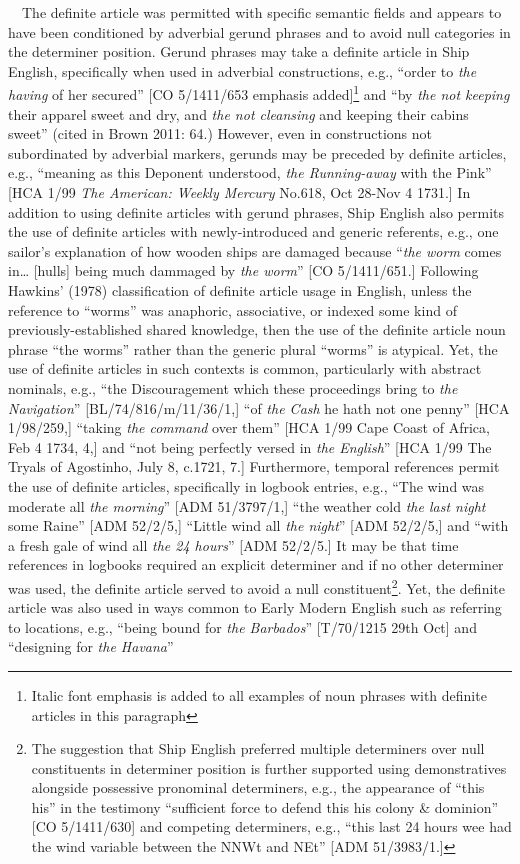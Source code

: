\begin{styleStandard}
\ \ The definite article was permitted with specific semantic fields and appears to have been conditioned by adverbial gerund phrases and to avoid null categories in the determiner position. Gerund phrases may take a definite article in Ship English, specifically when used in adverbial constructions, e.g., “order to \textit{the having} of her secured” [CO 5/1411/653 emphasis added]\footnote{ Italic font emphasis is added to all examples of noun phrases with definite articles in this paragraph} and “by \textit{the not keeping} their apparel sweet and dry, and \textit{the not cleansing} and keeping their cabins sweet” (cited in Brown 2011: 64.) However, even in constructions not subordinated by adverbial markers, gerunds may be preceded by definite articles, e.g., “meaning as this Deponent understood, \textit{the Running-away} with the Pink” [HCA 1/99 \textit{The American: Weekly Mercury }No.618, Oct 28-Nov 4 1731.] In addition to using definite articles with gerund phrases, Ship English also permits the use of definite articles with newly-introduced and generic referents, e.g., one sailor’s explanation of how wooden ships are damaged because “\textit{the worm} comes in… [hulls] being much dammaged by \textit{the worm}” [CO 5/1411/651.] Following Hawkins’ (1978) classification of definite article usage in English, unless the reference to “worms” was anaphoric, associative, or indexed some kind of previously-established shared knowledge, then the use of the definite article noun phrase “the worms” rather than the generic plural “worms” is atypical. Yet, the use of definite articles in such contexts is common, particularly with abstract nominals, e.g., “the Discouragement which these proceedings bring to \textit{the Navigation}” [BL/74/816/m/11/36/1,] “of \textit{the Cash }he hath not one penny” [HCA 1/98/259,] “taking \textit{the command} over them” [HCA 1/99 Cape Coast of Africa, Feb 4 1734, 4,] and “not being perfectly versed in \textit{the English}” [HCA 1/99 The Tryals of Agostinho, July 8, c.1721, 7.] Furthermore, temporal references permit the use of definite articles, specifically in logbook entries, e.g., “The wind was moderate all \textit{the morning}” [ADM 51/3797/1,] “the weather cold \textit{the last night} some Raine” [ADM 52/2/5,] “Little wind all \textit{the night}” [ADM 52/2/5,] and “with a fresh gale of wind all \textit{the 24 hours}” [ADM 52/2/5.] It may be that time references in logbooks required an explicit determiner and if no other determiner was used, the definite article served to avoid a null constituent\footnote{ The suggestion that Ship English preferred multiple determiners over null constituents in determiner position is further supported using demonstratives alongside possessive pronominal determiners, e.g., the appearance of “this his” in the testimony “sufficient force to defend this his colony \& dominion” [CO 5/1411/630] and competing determiners, e.g., “this last 24 hours wee had the wind variable between the NNWt and NEt” [ADM 51/3983/1.]}. Yet, the definite article was also used in ways common to Early Modern English such as referring to locations, e.g., “being bound for \textit{the Barbados}” [T/70/1215 29th Oct] and “designing for \textit{the Havana}” 
\end{styleStandard}
